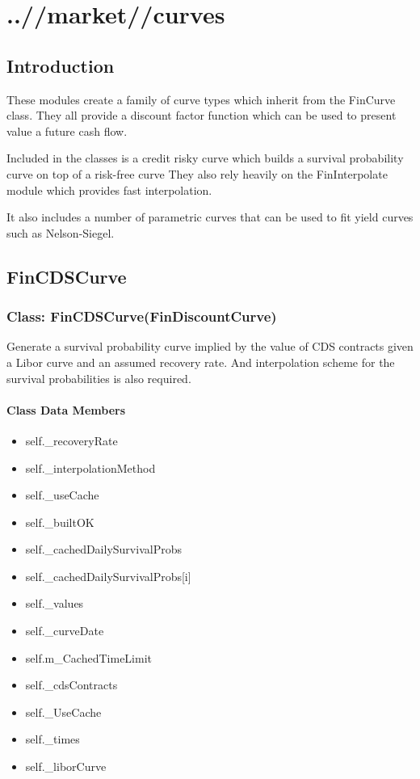\documentclass[twoside,11pt]{book}
\begin{document}
\chapter{..//market//curves}
\section{Introduction}
These modules create a family of curve types which inherit from the FinCurve class. They all provide a discount factor function which can be used to present value a future cash flow. 

Included in the classes is a credit risky curve which builds a survival probability curve on top of a risk-free curve They also rely heavily on the FinInterpolate module which provides fast interpolation.

It also includes a number of parametric curves that can be used to fit yield curves such as Nelson-Siegel.
\newpage
\section{FinCDSCurve}

\subsection{Class: FinCDSCurve(FinDiscountCurve)}
Generate a survival probability curve implied by the value of CDS contracts given a Libor curve and an assumed recovery rate. And interpolation scheme for the survival probabilities is also required. 

\subsubsection{Class Data Members}
\begin{itemize}
\item{self.\_recoveryRate}
\item{self.\_interpolationMethod}
\item{self.\_useCache}
\item{self.\_builtOK}
\item{self.\_cachedDailySurvivalProbs}
\item{self.\_cachedDailySurvivalProbs[i]}
\item{self.\_values}
\item{self.\_curveDate}
\item{self.m\_CachedTimeLimit}
\item{self.\_cdsContracts}
\item{self.\_UseCache}
\item{self.\_times}
\item{self.\_liborCurve}
\end{itemize}
\end{document}
